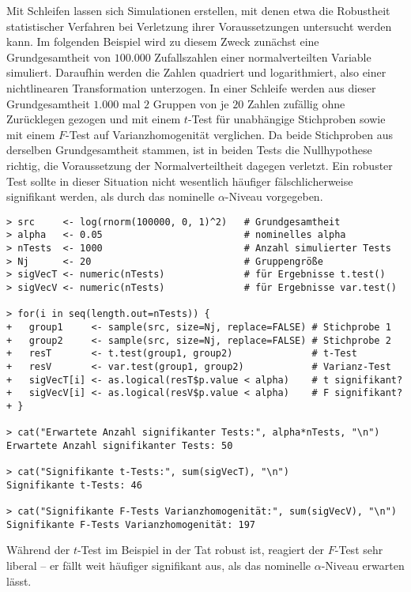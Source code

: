 Mit Schleifen lassen sich Simulationen erstellen, mit denen etwa die Robustheit statistischer Verfahren bei Verletzung ihrer Voraussetzungen untersucht werden kann. Im folgenden Beispiel wird zu diesem Zweck zunächst eine Grundgesamtheit von $100.000$ Zufallszahlen einer normalverteilten Variable simuliert. Daraufhin werden die Zahlen quadriert und logarithmiert, also einer nichtlinearen Transformation unterzogen. In einer Schleife werden aus dieser Grundgesamtheit $1.000$ mal $2$ Gruppen von je $20$ Zahlen zufällig ohne Zurücklegen gezogen und mit einem $t$-Test für unabhängige Stichproben sowie mit einem $F$-Test auf Varianzhomogenität verglichen. Da beide Stichproben aus derselben Grundgesamtheit stammen, ist in beiden Tests die Nullhypothese richtig, die Voraussetzung der Normalverteiltheit dagegen verletzt. Ein robuster Test sollte in dieser Situation nicht wesentlich häufiger fälschlicherweise signifikant werden, als durch das nominelle $\alpha$-Niveau vorgegeben.
\begin{lstlisting}
> src     <- log(rnorm(100000, 0, 1)^2)   # Grundgesamtheit
> alpha   <- 0.05                         # nominelles alpha
> nTests  <- 1000                         # Anzahl simulierter Tests
> Nj      <- 20                           # Gruppengröße
> sigVecT <- numeric(nTests)              # für Ergebnisse t.test()
> sigVecV <- numeric(nTests)              # für Ergebnisse var.test()

> for(i in seq(length.out=nTests)) {
+   group1     <- sample(src, size=Nj, replace=FALSE) # Stichprobe 1
+   group2     <- sample(src, size=Nj, replace=FALSE) # Stichprobe 2
+   resT       <- t.test(group1, group2)              # t-Test
+   resV       <- var.test(group1, group2)            # Varianz-Test
+   sigVecT[i] <- as.logical(resT$p.value < alpha)    # t signifikant?
+   sigVecV[i] <- as.logical(resV$p.value < alpha)    # F signifikant?
+ }

> cat("Erwartete Anzahl signifikanter Tests:", alpha*nTests, "\n")
Erwartete Anzahl signifikanter Tests: 50

> cat("Signifikante t-Tests:", sum(sigVecT), "\n")
Signifikante t-Tests: 46

> cat("Signifikante F-Tests Varianzhomogenität:", sum(sigVecV), "\n")
Signifikante F-Tests Varianzhomogenität: 197
\end{lstlisting}

Während der $t$-Test im Beispiel in der Tat robust ist, reagiert der $F$-Test sehr liberal -- er fällt weit häufiger signifikant aus, als das nominelle $\alpha$-Niveau erwarten lässt.

